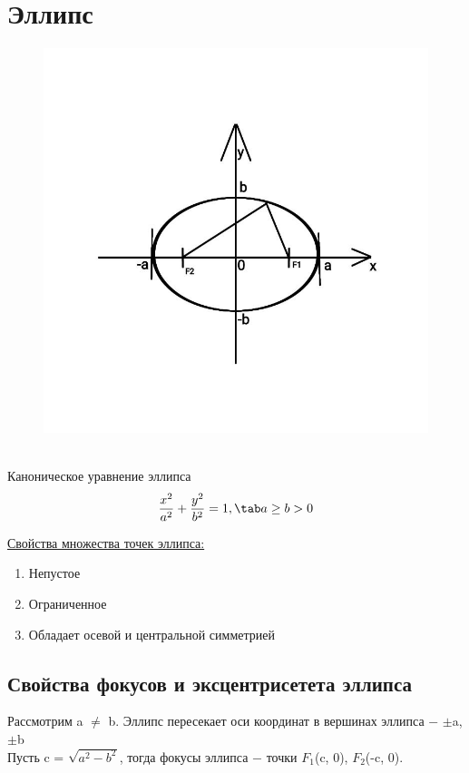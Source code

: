 \section{Эллипс}

\begin{figure}
    \includegraphics[width=0.84\linewidth]{images/эллипс1.jpeg}
\end{figure}

\tab\\

Каноническое уравнение эллипса
\[
\dfrac{x^2}{a^2} + \dfrac{y^2}{b^2} = 1, \tab a\geq b > 0
\]

\underline{Свойства множества точек эллипса:}
\begin{enumerate}
    \item Непустое
    \item Ограниченное
    \item Обладает осевой и центральной симметрией
\end{enumerate}

\clearpage
\subsection{Свойства фокусов и эксцентрисетета эллипса}

Рассмотрим a $\neq$ b. Эллипс пересекает оси координат в вершинах эллипса  $-$ $\pm$a, $\pm$b\\
    
Пусть c = $\sqrt{a^2 - b^2}$, тогда фокусы эллипса $-$ точки $F_1$(c, 0), $F_2$(-c, 0).\\
    
